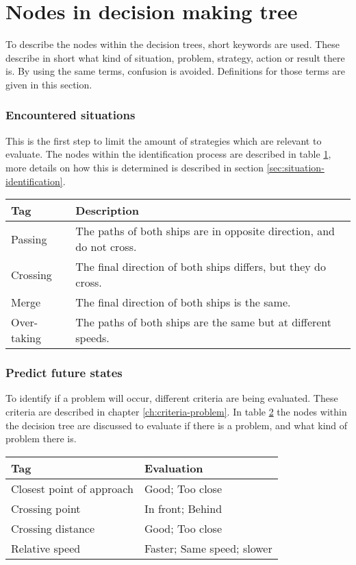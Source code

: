 \section{Nodes in decision making tree}
To describe the nodes within the decision trees, short keywords are used. These describe in short what kind of situation, problem, strategy, action or result there is. By using the same terms, confusion is avoided. Definitions for those terms are given in this section.

\subsubsection{Encountered situations}
This is the first step to limit the amount of strategies which are relevant to evaluate. The nodes within the identification process are described in table \ref{tab:situations}, more details on how this is determined is described in section \ref{sec:situation-identification}.
\begin{table}[H]
	\begin{tabular}{p{}|p{}}
		\toprule
		Tag & Description\\
		\midrule
		Passing & The paths of both ships are in opposite direction, and do not cross. \\
		Crossing & The final direction of both ships differs, but they do cross. \\
		Merge & The final direction of both ships is the same. \\
		Over-taking & The paths of both ships are the same but at different speeds. \\
		\bottomrule
	\end{tabular}
	
	\label{tab:situations}
\end{table}

\subsubsection{Predict future states}
To identify if a problem will occur, different criteria are being evaluated. These criteria are described in chapter \ref{ch:criteria-problem}. In table \ref{tab:identification-criteria} the nodes within the decision tree are discussed to evaluate if there is a problem, and what kind of problem there is. 
\begin{table}[H]
	\begin{tabular}{p{}|p{}}
		\toprule
		Tag & Evaluation \\
		\midrule
		Closest point of approach & Good; Too close \\
		Crossing point & In front; Behind \\
		Crossing distance & Good; Too close \\
		Relative speed & Faster; Same speed; slower \\
		\bottomrule
	\end{tabular}
	
	\label{tab:identification-criteria}
\end{table}

